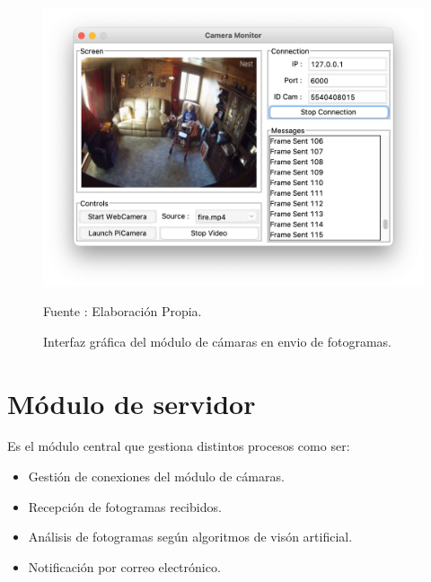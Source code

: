 \begin{figure}[H]
    \begin{center}
        \includegraphics[width=13cm]{img/capitulo_5/camera_working.png}
        \caption{Interfaz gráfica del módulo de cámaras en envio de fotogramas.}
        Fuente : Elaboración Propia.
        \label{fig:working_camera}
    \end{center}
\end{figure}


\section{Módulo de servidor}
Es el módulo central que gestiona distintos procesos como ser: 
\begin{itemize}
    \item Gestión de conexiones del módulo de cámaras.
    \item Recepción de fotogramas recibidos.
    \item Análisis de fotogramas según algoritmos de visón artificial.
    \item Notificación por correo electrónico.
\end{itemize}
